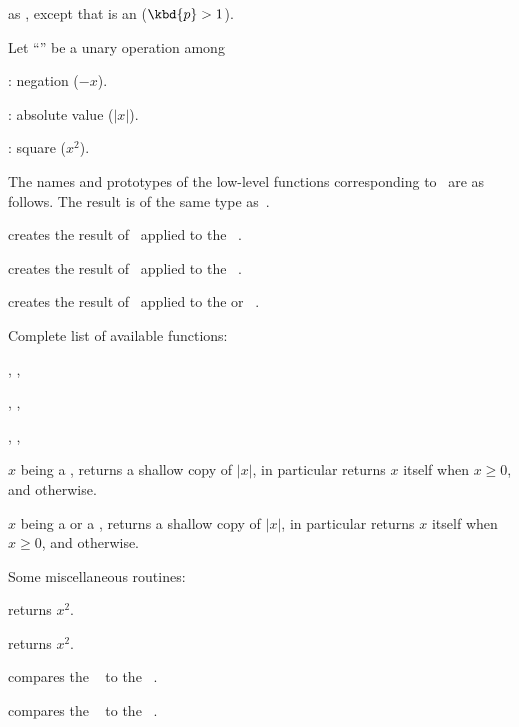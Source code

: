  as ,
except that  is an  ($\kbd{p} > 1$).

 Let ``\op'' be a unary operation among

\item {}: negation ($-x$).

\item {}: absolute value ($|x|$).

\item {}: square ($x^2$).

\noindent The names and prototypes of the low-level functions corresponding
to \op\ are as follows. The result is of the same type as~.

 creates the result of \op\ applied to the
~.

 creates the result of \op\ applied to the
~.

 creates the result of \op\ applied to the
 or ~.

\noindent Complete list of available functions:

, , 

, , 

, , 

 $x$ being a , returns a shallow copy of
$|x|$, in particular returns $x$ itself when $x \geq 0$, and 
otherwise.

 $x$ being a  or a , returns
a shallow copy of $|x|$, in particular returns $x$ itself when $x \geq 0$, and
 otherwise.


\noindent Some miscellaneous routines:

 returns $x^2$.

 returns $x^2$.


 compares the ~ to the
~.

 compares the ~ to the
~.


